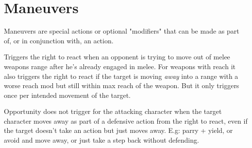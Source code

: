
































\section*{Maneuvers}


Maneuvers are special actions or optional "modifiers" that can be made as part of, or in conjunction with, an action.

\openskillslist


Triggers the right to react when an opponent is trying to move out of melee weapons range after he's already engaged in melee. For weapons with reach it also triggers the right to react if the target is moving \emph{away} into a range with a worse reach mod but still within max reach of the weapon. But it only triggers once per intended movement of the target.

Opportunity does not trigger for the attacking character when the target character moves away as part of a defensive action from the right to react, even if the target doesn't take an action but just moves away. E.g: parry + yield, or avoid and move away, or just take a step back without defending.

